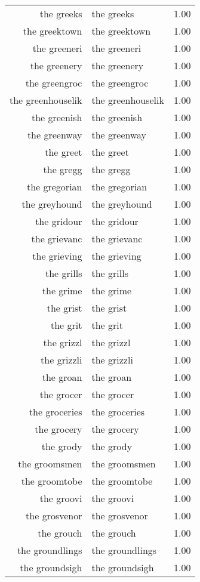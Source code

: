 \begin{table}[ht]
\begin{tabular}{rlr}
  the greeks & the greeks & 1.00 \\ 
  the greektown & the greektown & 1.00 \\ 
  the greeneri & the greeneri & 1.00 \\ 
  the greenery & the greenery & 1.00 \\ 
  the greengroc & the greengroc & 1.00 \\ 
  the greenhouselik & the greenhouselik & 1.00 \\ 
  the greenish & the greenish & 1.00 \\ 
  the greenway & the greenway & 1.00 \\ 
  the greet & the greet & 1.00 \\ 
  the gregg & the gregg & 1.00 \\ 
  the gregorian & the gregorian & 1.00 \\ 
  the greyhound & the greyhound & 1.00 \\ 
  the gridour & the gridour & 1.00 \\ 
  the grievanc & the grievanc & 1.00 \\ 
  the grieving & the grieving & 1.00 \\ 
  the grills & the grills & 1.00 \\ 
  the grime & the grime & 1.00 \\ 
  the grist & the grist & 1.00 \\ 
  the grit & the grit & 1.00 \\ 
  the grizzl & the grizzl & 1.00 \\ 
  the grizzli & the grizzli & 1.00 \\ 
  the groan & the groan & 1.00 \\ 
  the grocer & the grocer & 1.00 \\ 
  the groceries & the groceries & 1.00 \\ 
  the grocery & the grocery & 1.00 \\ 
  the grody & the grody & 1.00 \\ 
  the groomsmen & the groomsmen & 1.00 \\ 
  the groomtobe & the groomtobe & 1.00 \\ 
  the groovi & the groovi & 1.00 \\ 
  the grosvenor & the grosvenor & 1.00 \\ 
  the grouch & the grouch & 1.00 \\ 
  the groundlings & the groundlings & 1.00 \\ 
  the groundsigh & the groundsigh & 1.00 \\ 

\end{tabular}
\end{table}
